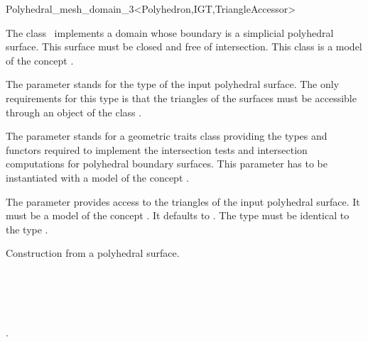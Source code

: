 \ccRefPageBegin


\begin{ccRefClass}{Polyhedral_mesh_domain_3<Polyhedron,IGT,TriangleAccessor>}  %


\ccDefinition
  
The class \ccRefName\ implements 
a domain whose boundary is a simplicial polyhedral surface.
 This surface must be closed and  free of intersection.
This class is a model of the concept .

\ccParameters

The parameter  stands for the type of the input polyhedral surface. 
The only requirements for this type is that the triangles of the surfaces
must be accessible through an object of the class  
.

The parameter  stands for  a geometric  traits class
providing the types and functors required to implement
the intersection tests and intersection computations
for polyhedral boundary  surfaces. This parameter has to be instantiated
with a model of the concept .

The parameter   provides access to the triangles
of the input polyhedral 
surface. It must be a model of the concept
. It defaults to
. The type  must
be identical to the type .
 


\ccIsModel
{}


\ccCreation
{}  %

{Construction from a polyhedral surface.}


\ccSeeAlso

 \\
 \\
 \\
\\
.






\end{ccRefClass}

\ccRefPageEnd

